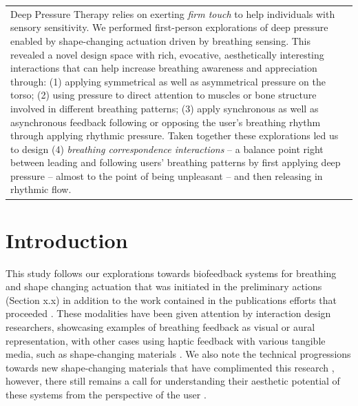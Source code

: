 \begin{center}
\begin{tabular}{ p{13cm}}
Deep Pressure Therapy relies on exerting \textit{firm touch} to help individuals with sensory sensitivity. We performed first-person explorations of deep pressure enabled by shape-changing actuation driven by breathing sensing. This revealed a novel design space with rich, evocative, aesthetically interesting interactions that can help increase breathing awareness and appreciation through: (1) applying symmetrical as well as asymmetrical pressure on the torso; (2) using pressure to direct attention to muscles or bone structure involved in different breathing patterns; (3) apply synchronous as well as asynchronous feedback following or opposing the user's breathing rhythm through applying rhythmic pressure. Taken together these explorations led us to design (4) \textit{breathing correspondence interactions} -- a balance point right between leading and following users' breathing patterns by first applying deep pressure -- almost to the point of being unpleasant -- and then releasing in rhythmic flow.
\end{tabular}
\end{center}

\section{Introduction}

This study follows our explorations towards biofeedback systems for breathing and shape changing actuation that was initiated in the preliminary actions (Section x.x) in addition to the work contained in the publications efforts that proceeded \cite{sanches_ambiguity_2019, alfaras_biodata_2020}. These modalities have been given attention by interaction design researchers, showcasing examples of breathing feedback as visual or aural representation, with other cases using haptic feedback with various tangible media, such as shape-changing materials \cite{prpa_inhaling_2020, miri_piv_2020}. We also note the technical progressions towards new shape-changing materials that have complimented this research \cite{coelho_shape-changing_2011}, however, there still remains a call for understanding their aesthetic potential of these systems from the perspective of the user \cite{rasmussen_shape-changing_2012,alexander_grand_2018}. 

